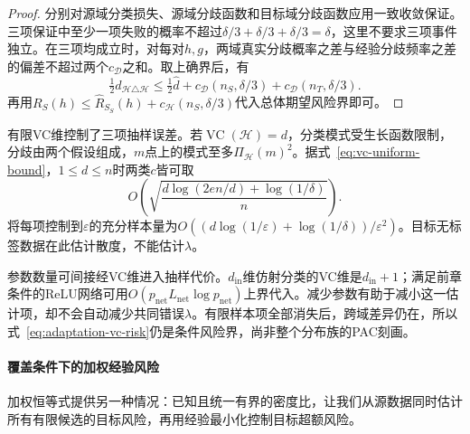 \begin{proof}
分别对源域分类损失、源域分歧函数和目标域分歧函数应用一致收敛保证。三项保证中至少一项失败的概率不超过$\delta/3+\delta/3+\delta/3=\delta$，这里不要求三项事件独立。在三项均成立时，对每对$h,g$，两域真实分歧概率之差与经验分歧频率之差的偏差不超过两个$c_{\mathcal D}$之和。取上确界后，有
\[
 \tfrac12d_{\mathcal H\triangle\mathcal H}
 \leq\tfrac12\widehat d
 +c_{\mathcal D}(n_S,\delta/3)+c_{\mathcal D}(n_T,\delta/3).
\]
再用$R_S(h)\leq\widehat R_{S_S}(h)+c_{\mathcal H}(n_S,\delta/3)$代入总体期望风险界即可。
\end{proof}

有限VC维控制了三项抽样误差。若$\operatorname{VC}(\mathcal H)=d$，分类模式受生长函数限制，分歧由两个假设组成，$m$点上的模式至多$\Pi_{\mathcal H}(m)^2$。据式~\eqref{eq:vc-uniform-bound}，$1\leq d\leq n$时两类$c$皆可取
\[
 O\!\left(\sqrt{\frac{d\log(2en/d)+\log(1/\delta)}{n}}\right).
\]
将每项控制到$\varepsilon$的充分样本量为$O((d\log(1/\varepsilon)+\log(1/\delta))/\varepsilon^2)$。目标无标签数据在此估计散度，不能估计$\lambda$。

参数数量可间接经VC维进入抽样代价。$d_{\mathrm{in}}$维仿射分类的VC维是$d_{\mathrm{in}}+1$；满足前章条件的ReLU网络可用$O(p_{\mathrm{net}}L_{\mathrm{net}}\log p_{\mathrm{net}})$上界代入。减少参数有助于减小这一估计项，却不会自动减少共同错误$\lambda$。有限样本项全部消失后，跨域差异仍在，所以式~\eqref{eq:adaptation-vc-risk}仍是条件风险界，尚非整个分布族的PAC刻画。

\paragraph{覆盖条件下的加权经验风险}
\label{sec:adaptation-coverage}

加权恒等式提供另一种情况：已知且统一有界的密度比，让我们从源数据同时估计所有有限候选的目标风险，再用经验最小化控制目标超额风险。

